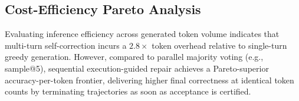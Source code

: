 \documentclass[letterpaper]{article} %
\begin{document}
\subsection{Cost-Efficiency Pareto Analysis}
Evaluating inference efficiency across generated token volume indicates that multi-turn self-correction incurs a $2.8\times$ token overhead relative to single-turn greedy generation. However, compared to parallel majority voting (e.g., sample@5), sequential execution-guided repair achieves a Pareto-superior accuracy-per-token frontier, delivering higher final correctness at identical token counts by terminating trajectories as soon as acceptance is certified.


\end{document}
